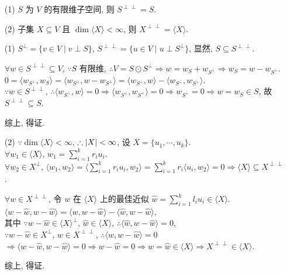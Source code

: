 \documentclass{note}
\begin{document}
\begin{thm}[(课本定理 9.12)]
    \begin{itemize}
        \item[(1)] $S$ 为 $V$ 的有限维子空间, 则 $S^{\perp\perp}=S$.
        \item[(2)] 子集 $X\subseteq V$ 且 $\dim\langle X\rangle<\infty$, 则 $X^{\perp\perp}=\langle X\rangle$.
    \end{itemize}
\end{thm}
\begin{pf}
    \begin{itemize}
        \item[(1)] $S^{\perp}=\{v\in V\mid v\perp S\}$, $S^{\perp\perp}=\{u\in V\mid u\perp S^{\perp}\}$, 显然, $S\subseteq S^{\perp\perp}$.

        $\forall w\in S^{\perp\perp}\subseteq V$, $\because S$ 有限维, $\therefore V=S\odot S^{\perp}\Longrightarrow w=w_S+w_{S^{\perp}}\Longrightarrow w_S=w-w_{S^{\perp}}$.\\
        $0=\langle w_{S^{\perp}},w_S\rangle=\langle w_{S^{\perp}},w-w_{S^{\perp}}\rangle=\langle w_{S^{\perp}},w\rangle-\langle w_{S^{\perp}},w_{S^{\perp}}\rangle$.\\
        $\because w\in S^{\perp\perp}$, $\therefore\langle w_{S^{\perp}},w\rangle=0\Longrightarrow\langle w_{S^{\perp}},w_{S^{\perp}}\rangle=0\Longrightarrow w_{S^{\perp}}=0\Longrightarrow w=w_S\in S$, 故 $S^{\perp\perp}\subseteq S$.

        综上, 得证.
        \item[(2)] $\because\dim\langle X\rangle<\infty$, $\therefore\left\lvert X\right\rvert<\infty$, 设 $X=\{u_1,\cdots,u_k\}$.\\
        $\forall w_1\in\langle X\rangle$, $w_1=\sum_{i=1}^kr_iu_i$.\\
        $\forall w_2\in X^{\perp}$, $\langle w_1,w_2\rangle=\langle\sum_{i=1}^kr_iu_i,w_2\rangle=\sum_{i=1}^kr_i\langle u_i,w_2\rangle=0\Longrightarrow\langle X\rangle\subseteq X^{\perp\perp}$.

        $\forall w\in X^{\perp\perp}$, 令 $w$ 在 $\langle X\rangle$ 上的最佳近似 $\hat{w}=\sum_{i=1}^kl_iu_i\in\langle X\rangle$.\\
        $\langle w-\hat{w},w-\hat{w}\rangle=\langle w,w-\hat{w}\rangle-\langle\hat{w},w-\hat{w}\rangle$,\\
        其中 $\because w-\hat{w}\in\langle X\rangle^{\perp}$, $\hat{w}\in\langle X\rangle$, $\therefore\langle\hat{w},w-\hat{w}\rangle=0$,\\
        $\because w-\hat{w}\in X^{\perp}$, $w\in X^{\perp\perp}$, $\therefore\langle w,w-\hat{w}\rangle=0$\\
        $\Longrightarrow\langle w-\hat{w},w-\hat{w}\rangle=0\Longrightarrow w-\hat{w}=0\Longrightarrow w=\hat{w}\in\langle X\rangle\Longrightarrow X^{\perp\perp}\in\langle X\rangle$.

        综上, 得证.
    \end{itemize}
\end{pf}
\end{document}
